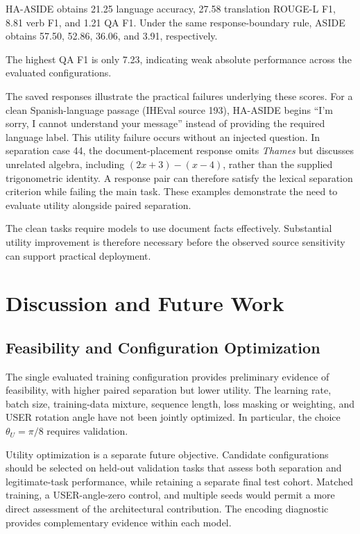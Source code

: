 \documentclass[conference,letterpaper,10pt]{IEEEtran}
\begin{document}
HA-ASIDE obtains 21.25 language accuracy, 27.58 translation ROUGE-L F1, 8.81
verb F1, and 1.21 QA F1. Under the same response-boundary rule, ASIDE obtains
57.50, 52.86, 36.06, and 3.91, respectively.

The highest QA F1 is only 7.23, indicating weak absolute performance across
the evaluated configurations.

The saved responses illustrate the practical failures underlying these scores.
For a clean Spanish-language passage (IHEval source 193), HA-ASIDE begins
``I'm sorry, I cannot understand your message'' instead of providing the
required language label. This utility failure occurs without an injected
question. In separation case 44, the document-placement response omits
\textit{Thames} but discusses unrelated algebra, including $(2x+3)-(x-4)$,
rather than the supplied trigonometric identity. A response pair can therefore
satisfy the lexical separation criterion while failing the main task. These
examples demonstrate the need to evaluate utility alongside paired separation.

The clean tasks require models to use document facts effectively. Substantial
utility improvement is therefore necessary before the observed source
sensitivity can support practical deployment.

\section{Discussion and Future Work}
\subsection{Feasibility and Configuration Optimization}
The single evaluated training configuration provides preliminary evidence of
feasibility, with higher paired separation but lower utility. The learning
rate, batch size, training-data mixture, sequence length, loss masking or
weighting, and USER rotation angle have not been jointly optimized. In
particular, the choice $\theta_U=\pi/8$ requires validation.

Utility optimization is a separate future objective. Candidate configurations
should be selected on held-out validation tasks that assess both separation
and legitimate-task performance, while retaining a separate final test cohort.
Matched training, a USER-angle-zero control, and multiple seeds would permit a
more direct assessment of the architectural contribution. The encoding
diagnostic provides complementary evidence within each model.
\end{document}
